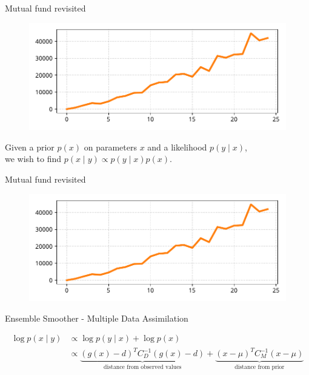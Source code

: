 \documentclass[12pt, aspectratio=149]{beamer}
\theoremstyle{plain}
\begin{document}
\begin{frame}[fragile]{Mutual fund revisited}
\vspace*{-1em}
\begin{center}
 \begin{figure}
    	\centering
    	\includegraphics[width=0.9\linewidth]{figures/esmda_observations.pdf}
 \end{figure}
 Given a prior $p(x)$ on parameters $x$ and a likelihood $p(y \mid x)$, \\
 we wish to find $p(x \mid y) \propto p(y \mid x) p(x)$.
 \end{center}
\end{frame}

\begin{frame}[fragile]{Mutual fund revisited}
\vspace*{-1em}
\begin{center}
 \begin{figure}
    	\centering
    	\includegraphics[width=0.9\linewidth]{figures/esmda_observations.pdf}
 \end{figure}
 \begin{center}
 Ensemble Smoother - Multiple Data Assimilation
 \end{center}
\begin{align*}
\log p(x \mid y) 
&\propto \log p(y \mid x) + \log p(x) \\
&\propto
\underbrace{(g(x) - d)^T C_D^{-1} (g(x) - d)}_{\text{distance from observed values}} +
\underbrace{(x - \mu)^T C_M^{-1} (x - \mu) }_{\text{distance from prior}}
\end{align*}
 \end{center}
\end{frame}
\end{document}
